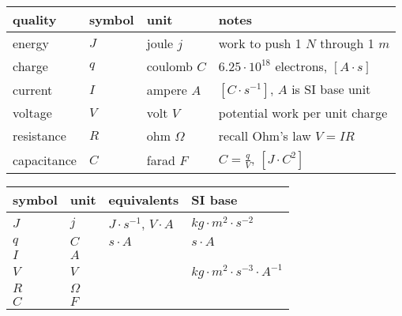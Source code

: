 \begin{table*}[htp!]
    \begin{center}

    \begin{tabular}{llll}
        \hline
        quality & symbol & unit  & notes \\
        \hline
        energy     & $J$ & joule   $j$  & work to push 1 $N$ through 1 $m$ \\
        charge     & $q$ & coulomb $C$  & $6.25\cdot10^{18}$ electrons, $[A\cdot s]$ \\
        current    & $I$ & ampere  $A$  & $[C\cdot s^{-1}]$, $A$ is SI base unit\\
        voltage    & $V$ & volt    $V$  & potential work per unit charge \\
        resistance & $R$ & ohm $\Omega$ & recall Ohm's law $V=IR$ \\
        capacitance& $C$ & farad   $F$  & $C=\frac{q}{V}$, $[J\cdot C^{2}]$\\
        \hline
    \end{tabular}

    \begin{tabular}{llll}
        \hline
        symbol & unit & equivalents & SI base \\
        \hline
        $J$    & $j$      &  $J\cdot s^{-1}$, $V\cdot A$ &
            $kg\cdot m^{2}\cdot s^{-2}$ \\

        $q$    & $C$      & $s\cdot A$ &
            $s\cdot A$ \\

        $I$    & $A$      &  & \\

        $V$    & $V$      &  &
            $kg\cdot m^{2}\cdot s^{-3}\cdot A^{-1}$ \\

        $R$    & $\Omega$ &   & \\
        $C$    & $F$      &   & \\
        \hline
    \end{tabular}

    \end{center}
    \caption{Symbols and quantities.}
\end{table*}


